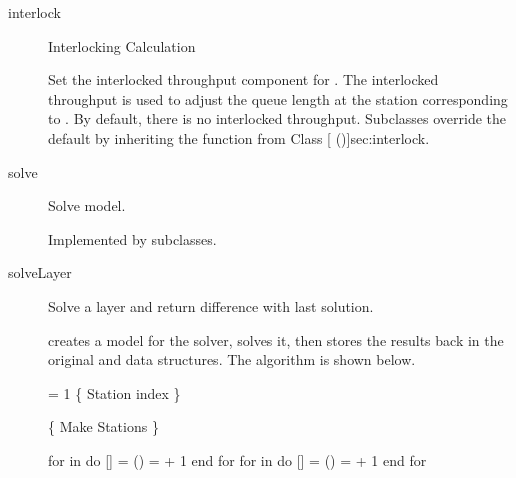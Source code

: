 \begin{description}

\label{sec:layerize-interlock}
\item[interlock] \texonly{---} Interlocking Calculation\\

Set the interlocked throughput component for .  The
interlocked throughput is used to adjust the queue length at the
station corresponding to .  By default, there is no
interlocked throughput.  Subclasses override the default by inheriting
the  function from Class [
(\Sec\Ref)]{sec:interlock}.

\label{sec:layerize-solve}

\item[solve] \texonly{---} Solve model.\\

Implemented by subclasses.


\label{sec:layerize-solveLayer}
\item[solveLayer] \texonly{---} Solve a layer and return difference with last solution.\\

 creates a model for the 
solver, solves it, then stores the results back in the original
 and
 data structures.  The algorithm
is shown below.

\begin{example}
   = 1           \{ Station index \}

  \{ Make Stations \}

  for  in  do
    [] = ()
     =  + 1
  end for
  for  in  do
    [] = ()
     =  + 1
  end for


\end{example}
\end{description}
